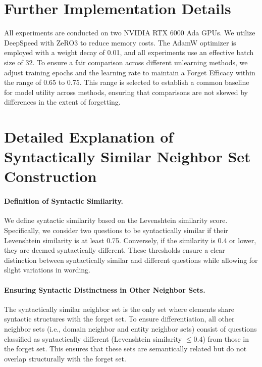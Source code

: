 \section{Further Implementation Details}
All experiments are conducted on two NVIDIA RTX 6000 Ada GPUs. We utilize DeepSpeed with ZeRO3 to reduce memory costs. The AdamW optimizer is employed with a weight decay of 0.01, and all experiments use an effective batch size of 32.
To ensure a fair comparison across different unlearning methods, we adjust training epochs and the learning rate to maintain a Forget Efficacy within the range of 0.65 to 0.75. This range is selected to establish a common baseline for model utility across methods, ensuring that comparisons are not skewed by differences in the extent of forgetting. 
\label{appendix:implementationDetails}



\section{Detailed Explanation of Syntactically Similar Neighbor Set Construction}
\label{appendix:dataset_construction}

\paragraph{Definition of Syntactic Similarity.} We define syntactic similarity based on the Levenshtein similarity score. Specifically, we consider two questions to be syntactically similar if their Levenshtein similarity is at least 0.75. Conversely, if the similarity is 0.4 or lower, they are deemed syntactically different. These thresholds ensure a clear distinction between syntactically similar and different questions while allowing for slight variations in wording.

\paragraph{Ensuring Syntactic Distinctness in Other Neighbor Sets.} The syntactically similar neighbor set is the only set where elements share syntactic structures with the forget set. To ensure differentiation, all other neighbor sets (i.e., domain neighbor and entity neighbor sets) consist of questions classified as syntactically different (Levenshtein similarity $\leq 0.4$) from those in the forget set. This ensures that these sets are semantically related but do not overlap structurally with the forget set.

